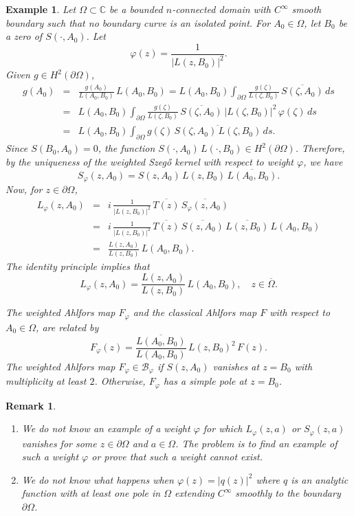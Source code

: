 \documentclass[11pt, reqno]{amsart}
\newtheorem{rem}[thm]{Remark}
\newtheorem{exam}[thm]{Example}
\numberwithin{equation}{section}
\newcommand{\ov}{\overline}
\newcommand{\Om}{\Omega}
\begin{document}
	\begin{exam}
		Let $\Omega\subset\mathbb{C}$ be a bounded $n$-connected domain with $C^{\infty}$ smooth boundary such that no boundary curve is an isolated point. For $A_0\in\Om$, let $B_0$ be a zero of $S(\cdot,A_0)$. Let 
		\[
		\varphi(z) = \frac{1}{\vert L(z,B_0)\vert^{2}}.
		\]
		Given $g\in H^2(\partial\Omega)$,
		\begin{eqnarray*}
			g(A_0) 
			&=&
			\frac{g(A_0)}{L(A_0,B_0)} \, L(A_0,B_0)
			=
			L(A_0,B_0) \int_{\partial\Om} \frac{g(\zeta)}{L(\zeta,B_0)} \,\overline{S(\zeta,A_0)} \,ds
			\\&=&
			L(A_0,B_0) \int_{\partial\Om}  \frac{g(\zeta)}{L(\zeta,B_0)} \,\overline{S(\zeta,A_0)} \,\vert L(\zeta,B_0)\vert^{2}\,\varphi(\zeta) \,ds
			\\&=&
			L(A_0,B_0) \int_{\partial\Om}  g(\zeta) \,\overline{S(\zeta,A_0)\,L(\zeta,B_0)} \,ds.
		\end{eqnarray*}
		Since $S(B_0,A_0) = 0$, the function $S(\cdot,A_0)\,L(\cdot,B_0) \in H^2(\partial\Om)$.
		Therefore, by the uniqueness of the weighted Szeg\H{o} kernel with respect to weight $\varphi$, we have
		\[
		S_{\varphi}(z,A_0) = S(z,A_0)\,L(z,B_0)\,\overline{L(A_0,B_0)}.
		\]
		Now, for $z\in\partial\Om$,
		\begin{eqnarray*}
			L_{\varphi}(z,A_0) 
			&=&
			i \, \frac{1}{\vert L(z,B_0)\vert^2} \, \overline{T(z)}\, \overline{S_{\varphi}(z,A_0)} 
			\\&=&
			i \, \frac{1}{\vert L(z,B_0)\vert^2} \, \overline{T(z)}\, \overline{S(z,A_0)}\,\overline{L(z,B_0)}\,L(A_0,B_0)
			\\&=&
			\frac{L(z,A_0)}{L(z,B_0)} \,L(A_0,B_0).
		\end{eqnarray*}
		The identity principle implies that
		\[
		L_{\varphi}(z,A_0)  = 	\frac{L(z,A_0)}{L(z,B_0)} \,L(A_0,B_0),
		\quad z\in\ov{\Om}.
		\]
		
		\medskip
		
		The weighted Ahlfors map $F_{\varphi}$ and the classical Ahlfors map $F$ with respect to $A_0\in \Om$, are related by
		\[
		F_{\varphi}(z) = \frac{\overline{L(A_0,B_0)}}{L(A_0,B_0)} \, L(z,B_0)^2 \, F(z).
		\]
		The weighted Ahlfors map $F_{\varphi}\in \mathcal{B}_{\varphi}$ if $S(z,A_0)$ vanishes at $z=B_0$ with multiplicity at least $2$. Otherwise, $F_{\varphi}$ has a simple pole at $z=B_0$.
	\end{exam}
	
	\begin{rem}
		\begin{enumerate}
			\item We do not know an example of a weight $\varphi$ for which $L_{\varphi}(z,a)$ or $S_{\varphi}(z,a)$ vanishes for some $z\in\partial\Om$ and $a\in\Om$. The problem is to find an example of such a weight $\varphi$ or prove that such a weight cannot exist.
			\item We do not know what happens when $\varphi(z) = \vert q(z)\vert^2$ where $q$ is an analytic function with at least one pole in $\Om$ extending $C^{\infty}$ smoothly to the boundary $\partial\Omega$.
		\end{enumerate}
	\end{rem}
	
\end{document}
